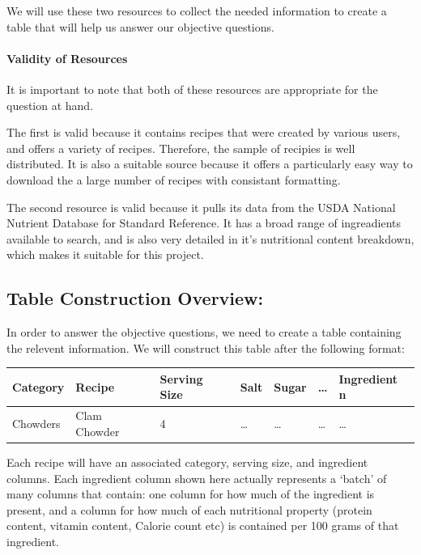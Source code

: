 \documentclass[11pt]{article}
\begin{document}
We will use these two resources to collect the needed information to
create a table that will help us answer our objective questions.

    \hypertarget{validity-of-resources}{%
\paragraph{Validity of Resources}\label{validity-of-resources}}

It is important to note that both of these resources are appropriate for
the question at hand.

The first is valid because it contains recipes that were created by
various users, and offers a variety of recipes. Therefore, the sample of
recipies is well distributed. It is also a suitable source because it
offers a particularly easy way to download the a large number of recipes
with consistant formatting.

The second resource is valid because it pulls its data from the USDA
National Nutrient Database for Standard Reference. It has a broad range
of ingreadients available to search, and is also very detailed in it's
nutritional content breakdown, which makes it suitable for this project.

\hypertarget{table-construction-overview}{%
\subsection{Table Construction
Overview:}\label{table-construction-overview}}

In order to answer the objective questions, we need to create a table
containing the relevent information. We will construct this table after
the following format:

\begin{longtable}[]{@{}lllllll@{}}
\toprule
Category & Recipe & Serving Size & Salt & Sugar & \ldots{} & Ingredient
n\tabularnewline
\midrule
\endhead
Chowders & Clam Chowder & 4 & \ldots{} & \ldots{} & \ldots{} &
\ldots{}\tabularnewline
\bottomrule
\end{longtable}

Each recipe will have an associated category, serving size, and
ingredient columns. Each ingredient column shown here actually
represents a `batch' of many columns that contain: one column for how
much of the ingredient is present, and a column for how much of each
nutritional property (protein content, vitamin content, Calorie count
etc) is contained per 100 grams of that ingredient.
\end{document}
